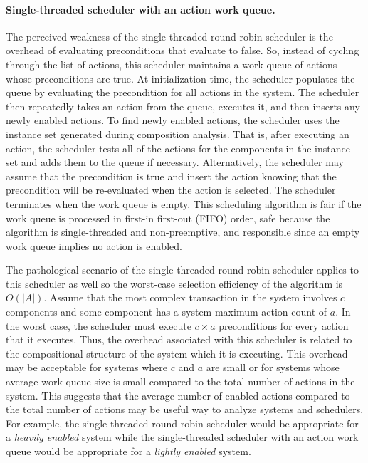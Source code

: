 \paragraph{Single-threaded scheduler with an action work queue.}
The perceived weakness of the single-threaded round-robin scheduler is the overhead of evaluating preconditions that evaluate to false.
So, instead of cycling through the list of actions, this scheduler maintains a work queue of actions whose preconditions are true.
At initialization time, the scheduler populates the queue by evaluating the precondition for all actions in the system.
The scheduler then repeatedly takes an action from the queue, executes it, and then inserts any newly enabled actions.
To find newly enabled actions, the scheduler uses the instance set generated during composition analysis.
That is, after executing an action, the scheduler tests all of the actions for the components in the instance set and adds them to the queue if necessary.
Alternatively, the scheduler may assume that the precondition is true and insert the action knowing that the precondition will be re-evaluated when the action is selected.
The scheduler terminates when the work queue is empty.
This scheduling algorithm is fair if the work queue is processed in first-in first-out (FIFO) order, safe because the algorithm is single-threaded and non-preemptive, and responsible since an empty work queue implies no action is enabled.

The pathological scenario of the single-threaded round-robin scheduler applies to this scheduler as well so the worst-case selection efficiency of the algorithm is $O(|A|)$.
Assume that the most complex transaction in the system involves $c$ components and some component has a system maximum action count of $a$.
In the worst case, the scheduler must execute $c \times a$ preconditions for every action that it executes.
Thus, the overhead associated with this scheduler is related to the compositional structure of the system which it is executing.
This overhead may be acceptable for systems where $c$ and $a$ are small or for systems whose average work queue size is small compared to the total number of actions in the system.
This suggests that the average number of enabled actions compared to the total number of actions may be useful way to analyze systems and schedulers.
For example, the single-threaded round-robin scheduler would be appropriate for a \emph{heavily enabled} system while the single-threaded scheduler with an action work queue would be appropriate for a \emph{lightly enabled} system.

